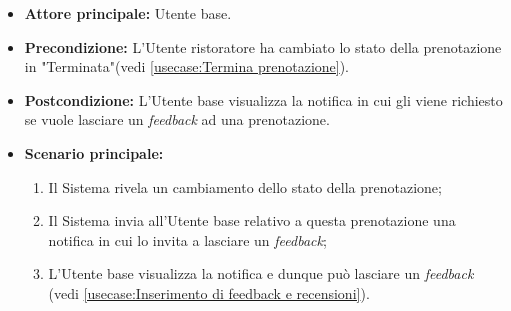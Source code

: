 \label{usecase:Visualizzazione della notifica di richiesta di inserimento feedback}
\begin{itemize}
	\item \textbf{Attore principale:} Utente base.


	\item \textbf{Precondizione:} L'Utente ristoratore ha cambiato lo stato della prenotazione in "Terminata"(vedi \autoref{usecase:Termina prenotazione}).


	\item \textbf{Postcondizione:} L'Utente base visualizza la notifica in cui
	      gli viene richiesto se vuole lasciare un \textit{feedback} ad una prenotazione.

	\item \textbf{Scenario principale:}
	      \begin{enumerate}
		      \item Il Sistema rivela un cambiamento dello stato della prenotazione;
		      \item Il Sistema invia all'Utente base relativo a questa prenotazione una notifica in cui lo invita a lasciare un \textit{feedback};
		      \item L'Utente base visualizza la notifica e dunque può lasciare un \textit{feedback} (vedi \autoref{usecase:Inserimento di feedback e recensioni}).
	      \end{enumerate}
\end{itemize}
